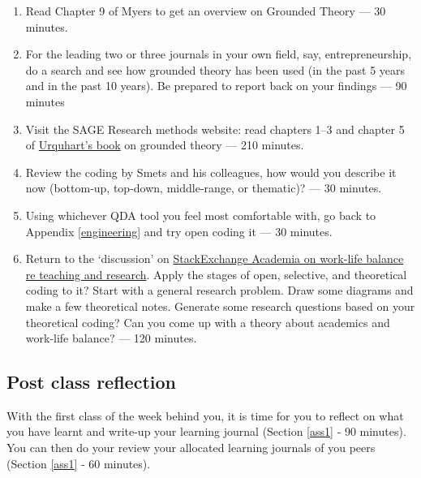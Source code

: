 \documentclass[]{book}
\theoremstyle{definition}
\theoremstyle{definition}
\theoremstyle{definition}
\theoremstyle{remark}
\begin{document}
\begin{enumerate}
\def\labelenumi{\arabic{enumi}.}
\item
  Read Chapter 9 of Myers \autocite*[
  p.~209--220]{myers_2013_qualitativeresearchbusiness} to get an
  overview on Grounded Theory --- 30 minutes.
\item
  For the leading two or three journals in your own field, say,
  entrepreneurship, do a search and see how grounded theory has been
  used (in the past 5 years and in the past 10 years). Be prepared to
  report back on your findings --- 90 minutes
\item
  Visit the SAGE Research methods website: read chapters 1--3 and
  chapter 5 of
  \href{http://methods.sagepub.com/book/grounded-theory-for-qualitative-research}{Urquhart's
  book} \autocite{urquhart_2017_groundedtheoryqualitative} on grounded
  theory --- 210 minutes.
\item
  Review the coding by Smets and his colleagues, how would you describe
  it now (bottom-up, top-down, middle-range, or thematic)? --- 30
  minutes.
\item
  Using whichever QDA tool you feel most comfortable with, go back to
  Appendix \ref{engineering} and try open coding it --- 30 minutes.
\item
  Return to the `discussion' on
  \href{https://academia.stackexchange.com/questions/89362/how-do-academics-with-teaching-responsibilities-etc-find-the-time-to-do-resear}{StackExchange
  Academia on work-life balance re teaching and research}. Apply the
  stages of open, selective, and theoretical coding to it? Start with a
  general research problem. Draw some diagrams and make a few
  theoretical notes. Generate some research questions based on your
  theoretical coding? Can you come up with a theory about academics and
  work-life balance? --- 120 minutes.
\end{enumerate}

\hypertarget{post-class-reflection-8}{%
\subsection{Post class reflection}\label{post-class-reflection-8}}

With the first class of the week behind you, it is time for you to
reflect on what you have learnt and write-up your learning journal
(Section \ref{ass1} ‐ 90 minutes). You can then do your review your
allocated learning journals of you peers (Section \ref{ass1} ‐ 60
minutes).
\end{document}
